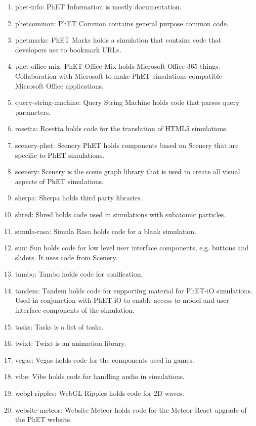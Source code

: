 \documentclass[titlepage]{article}
\begin{document}
\begin{enumerate}
			\item phet-info: PhET Information is mostly documentation.
			\item phetcommon: PhET Common contains general purpose common code.
			\item phetmarks: PhET Marks holds a simulation that contains code that developers use to bookmark URLs.
			\item phet-office-mix: PhET Office Mix holds Microsoft Office 365 things. Collaboration with Microsoft to make PhET simulations compatible Microsoft Office applications.
			\item query-string-machine: Query String Machine holds code that parses query parameters.
			\item rosetta: Rosetta holds code for the translation of HTML5 simulations.
			\item scenery-phet: Scenery PhET holds components based on Scenery that are specific to PhET simulations.
			\item scenery: Scenery is the scene graph library that is used to create all visual aspects of PhET simulations.
			\item sherpa: Sherpa holds third party libraries.
			\item shred: Shred holds code used in simulations with subatomic particles.
			\item simula-rasa: Simula Rasa holds code for a blank simulation.
			\item sun: Sun holds code for low level user interface components, e.g. buttons and sliders. It uses code from Scenery.
			\item tambo: Tambo holds code for sonification.
			\item tandem: Tandem holds code for supporting material for PhET-iO simulations. Used in conjunction with PhET-iO to enable access to model and user interface components of the simulation.
			\item tasks: Tasks is a list of tasks.
			\item twixt: Twixt is an animation library. 
			\item vegas: Vegas holds code for the components used in games.
			\item vibe: Vibe holds code for handling audio in simulations.
			\item webgl-ripples: WebGL Ripples holds code for 2D waves.
			\item website-meteor: Website Meteor holds code for the Meteor-React upgrade of the PhET website.
		\end{enumerate}
\end{document}
